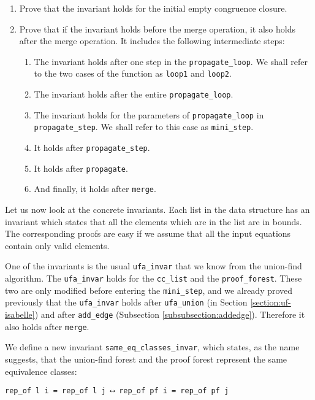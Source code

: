 \begin{enumerate}
	\item Prove that the invariant holds for the initial empty congruence closure.

	\item Prove that if the invariant holds before the merge operation, it also holds after the merge operation. It includes the following intermediate steps:
    \begin{enumerate}
        \item The invariant holds after one step in the \lstinline{propagate_loop}. We shall refer to the two cases of the function as \lstinline{loop1} and \lstinline{loop2}.
    	\item The invariant holds after the entire \lstinline{propagate_loop}.
    	\item The invariant holds for the parameters of \lstinline{propagate_loop} in \lstinline{propagate_step}. We shall refer to this case as \lstinline{mini_step}.
    	\item It holds after \lstinline{propagate_step}.
    	\item It holds after \lstinline{propagate}.
    	\item And finally, it holds after \lstinline{merge}.
    \end{enumerate}
\end{enumerate}

Let us now look at the concrete invariants. Each list in the data structure has an invariant which states that all the elements which are in the list are in bounds. The corresponding proofs are easy if we assume that all the input equations contain only valid elements.

One of the invariants is the usual \lstinline{ufa_invar} that we know from the union-find algorithm. The \lstinline{ufa_invar} holds for the \lstinline{cc_list} and the \lstinline{proof_forest}. These two are only modified before entering the \lstinline{mini_step}, and we already proved previously that the \lstinline{ufa_invar} holds after \lstinline{ufa_union} (in Section \ref{section:uf-isabelle}) and after \lstinline{add_edge} (Subsection \ref{subsubsection:addedge}). Therefore it also holds after \lstinline{merge}.

We define a new invariant \lstinline{same_eq_classes_invar}, which states, as the name suggests, that the union-find forest and the proof forest represent the same equivalence classes:

\begin{lstlisting}
rep_of l i = rep_of l j ⟷ rep_of pf i = rep_of pf j
\end{lstlisting}

